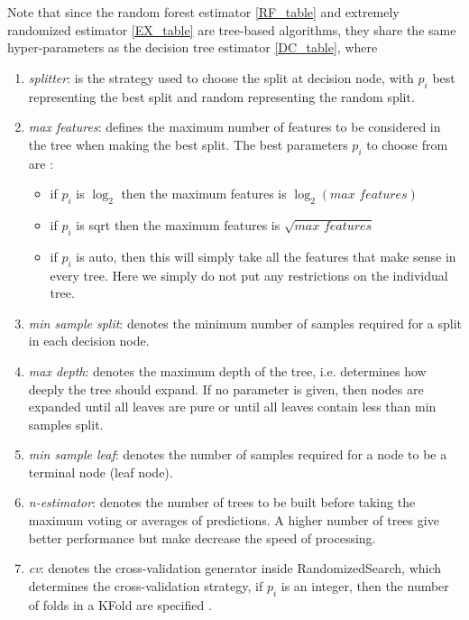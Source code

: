 Note that since the random forest estimator \ref{RF_table} and extremely randomized estimator 
\ref{EX_table} are tree-based algorithms, they share the same hyper-parameters as the decision tree estimator \ref{DC_table}, where 
\begin{enumerate}
\item \textit{splitter}: is the strategy used to choose the split at decision node, with $p_i$ best representing the best split and random representing the random split.

\item \textit{max features}: defines the maximum number of features to be considered in the tree when making the best split. The best parameters $p_i$ to choose from are : 
\begin{itemize}
\item if $p_i$ is $\log_2$ then the maximum features is  $\log_2\left(\textit{max features} \right)$

\item if $p_i$ is sqrt then the maximum features is $\sqrt{\textit{max features}}$ 
\item if $p_i$ is auto, then this will simply take all the features that make sense in every tree. Here we simply do not put any restrictions on the individual tree. 
\end{itemize}
\item \textit{min sample split}: denotes the minimum number of samples required for a split in each decision node.
\item \textit{max depth}: denotes the maximum depth of the tree, i.e. determines how deeply the tree should expand. If no parameter is given, then nodes are expanded until all leaves are pure or until all leaves contain less than min samples split.

\item \textit{min sample leaf}: denotes the number of samples required for a node to be a terminal node (leaf node).
\item \textit{n-estimator}: denotes  the number of trees  to be built before taking the maximum voting or averages of predictions. A higher number of trees give better performance but make decrease the speed of processing.
\item \textit{cv}: denotes the cross-validation generator inside RandomizedSearch, which determines the cross-validation strategy, if $p_i$ is an integer, then the number of folds in a KFold are specified \citep{pedregosa2011scikit}. 
\end{enumerate}


